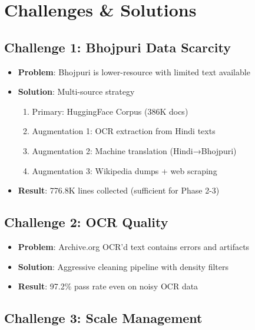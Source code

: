 \documentclass[11pt,a4paper]{article}
\begin{document}
\section{Challenges \& Solutions}

\subsection{Challenge 1: Bhojpuri Data Scarcity}

\begin{itemize}
    \item \textbf{Problem}: Bhojpuri is lower-resource with limited text available
    \item \textbf{Solution}: Multi-source strategy
    \begin{enumerate}
        \item Primary: HuggingFace Corpus (386K docs)
        \item Augmentation 1: OCR extraction from Hindi texts
        \item Augmentation 2: Machine translation (Hindi→Bhojpuri)
        \item Augmentation 3: Wikipedia dumps + web scraping
    \end{enumerate}
    \item \textbf{Result}: 776.8K lines collected (sufficient for Phase 2-3)
\end{itemize}

\subsection{Challenge 2: OCR Quality}

\begin{itemize}
    \item \textbf{Problem}: Archive.org OCR'd text contains errors and artifacts
    \item \textbf{Solution}: Aggressive cleaning pipeline with density filters
    \item \textbf{Result}: 97.2\% pass rate even on noisy OCR data
\end{itemize}

\subsection{Challenge 3: Scale Management}
\end{document}
